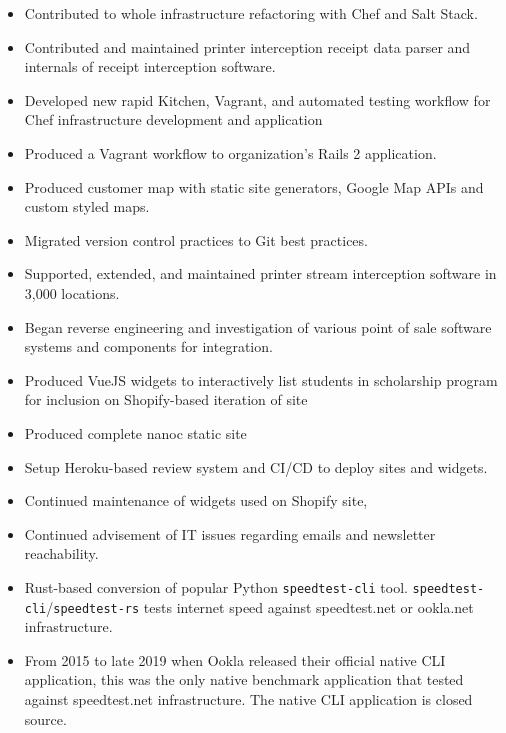 \documentclass[10pt,letter,ragged2e]{altacv}
\begin{document}
\begin{paracol}{2}
\divider

\begin{itemize}
\item Contributed to whole infrastructure refactoring with Chef and Salt Stack.
\item Contributed and maintained printer interception receipt data parser and internals of receipt interception software.
\item Developed new rapid Kitchen, Vagrant, and automated testing workflow for Chef infrastructure development and application
\item Produced a Vagrant workflow to organization's Rails 2 application.
\item Produced customer map with static site generators, Google Map APIs and custom styled maps. 
\item Migrated version control practices to Git best practices.
\item Supported, extended, and maintained printer stream interception software in 3,000 locations.
\item Began reverse engineering and investigation of various point of sale software systems and components for integration.
\end{itemize}

\begin{itemize}
\item Produced VueJS widgets to interactively list students in scholarship program for inclusion on Shopify-based iteration of site
\item Produced complete nanoc static site
\item Setup Heroku-based review system and CI/CD to deploy sites and widgets.
\item Continued maintenance of widgets used on Shopify site,
\item Continued advisement of IT issues regarding emails and newsletter reachability.
\end{itemize}



\begin{itemize}
\item Rust-based conversion of popular Python \texttt{speedtest-cli} tool. \texttt{speedtest-cli}/\texttt{speedtest-rs} tests internet speed against speedtest.net or ookla.net infrastructure.
\item From 2015 to late 2019 when Ookla released their official native CLI application, this was the only native benchmark application that tested against speedtest.net infrastructure. The native CLI application is closed source.
\end{itemize}


\end{paracol}
\end{document}
